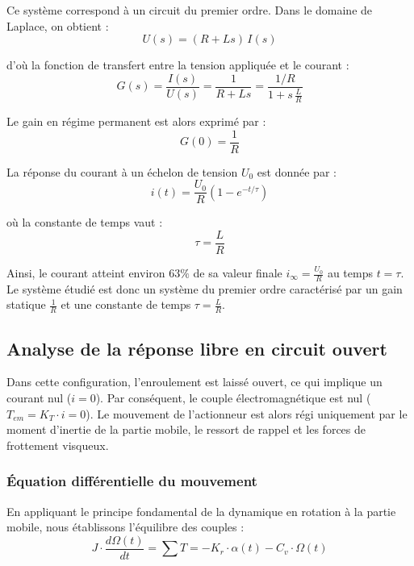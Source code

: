 Ce système correspond à un circuit du premier ordre. Dans le domaine de Laplace, on obtient :
\begin{equation}
U(s) = (R + Ls)\,I(s)
\end{equation}

d’où la fonction de transfert entre la tension appliquée et le courant :
\begin{equation}
G(s) = \frac{I(s)}{U(s)} = \frac{1}{R + Ls} = \frac{1/R}{1 + s\,\frac{L}{R}}
\end{equation}

Le gain en régime permanent est alors exprimé par :
\begin{equation}
G(0) = \frac{1}{R}
\label{eq:calc_gain}
\end{equation}

La réponse du courant à un échelon de tension $U_0$ est donnée par :
\begin{equation}
i(t) = \frac{U_0}{R} \left(1 - e^{-t/\tau} \right)
\end{equation}

où la constante de temps vaut :
\begin{equation}
\tau = \frac{L}{R}
\label{eq:calc_tau}
\end{equation}

Ainsi, le courant atteint environ $63\%$ de sa valeur finale $i_\infty = \frac{U_0}{R}$ au temps $t = \tau$. Le système étudié est donc un système du premier ordre caractérisé par un gain statique $\frac{1}{R}$ et une constante de temps $\tau = \frac{L}{R}$.

\subsection{Analyse de la réponse libre en circuit ouvert}

Dans cette configuration, l'enroulement est laissé ouvert, ce qui implique un courant nul ($i = 0$). Par conséquent, le couple électromagnétique est nul ($T_{em} = K_T \cdot i = 0$). Le mouvement de l'actionneur est alors régi uniquement par le moment d'inertie de la partie mobile, le ressort de rappel et les forces de frottement visqueux.

\subsubsection{Équation différentielle du mouvement}

En appliquant le principe fondamental de la dynamique en rotation à la partie mobile, nous établissons l'équilibre des couples :
\begin{equation}
J \cdot \frac{d\Omega(t)}{dt} = \sum T = -K_r \cdot \alpha(t) - C_v \cdot \Omega(t)
\end{equation}


